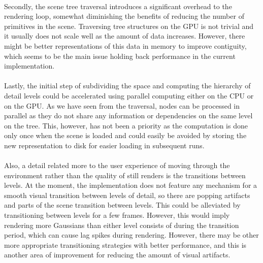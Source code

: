 \paragraph{}

Secondly, the scene tree traversal introduces a significant overhead to the rendering loop, somewhat diminishing the benefits of reducing the number of primitives in the scene. Traversing tree structures on the GPU is not trivial and it usually does not scale well as the amount of data increases. However, there might be better representations of this data in memory to improve contiguity, which seems to be the main issue holding back performance in the current implementation.
\paragraph{}

Lastly, the initial step of subdividing the space and computing the hierarchy of detail levels could be accelerated using parallel computing either on the CPU or on the GPU. As we have seen from the traversal, nodes can be processed in parallel as they do not share any information or dependencies on the same level on the tree. This, however, has not been a priority as the computation is done only once when the scene is loaded and could easily be avoided by storing the new representation to disk for easier loading in subsequent runs.
\paragraph{}

Also, a detail related more to the user experience of moving through the environment rather than the quality of still renders is the transitions between levels. At the moment, the implementation does not feature any mechanism for a smooth visual transition between levels of detail, so there are popping artifacts and parts of the scene transition between levels. This could be alleviated by transitioning between levels for a few frames. However, this would imply rendering more Gaussians than either level consists of during the transition period, which can cause lag spikes during rendering. However, there may be other more appropriate transitioning strategies with better performance, and this is another area of improvement for reducing the amount of visual artifacts.
